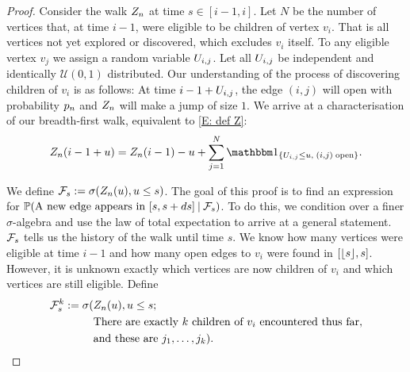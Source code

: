 \begin{proof} \label{P: formula an}
	Consider the walk $Z_n$ at time $s\in[i-1, i]$.
	Let $N$ be the number of vertices that, at time $i-1$, were eligible to be children of vertex $v_i$.
	That is all vertices not yet explored or discovered, which excludes $v_i$ itself.
	To any eligible vertex $v_j$ we assign a random variable $U_{i,j}$.
	Let all $U_{i,j}$ be independent and identically $\mathcal{U}(0,1)$ distributed.
	Our understanding of the process of discovering children of $v_i$ is as follows:
	At time $i-1+U_{i,j}$, the edge $(i,j)$ will open with probability $p_n$ and
	$Z_n$ will make a jump of size $1$.
	We arrive at a characterisation of our breadth-first walk, 
	equivalent to \eqref{E: def Z}:	
	\begin{equation}
	\Zn(i-1+u) = \Zn(i-1) - u + \sum_{j=1}^{N} \Ind{\{\Uij \leq u, \; (i,j) \; \text{open}\}}.
	\end{equation}
	
	We define $\mathcal{F}_s := \sigma(Z_n(u), u\leq s)$.
	The goal of this proof is to find an expression for
	$\mathbb{P}(\text{A new edge appears in $[s, s+ds]$} \: | \: \mathcal{F}_s)$.
	To do this, we condition over a finer $\sigma$-algebra and use the law of total expectation to arrive at a general statement.
	$\mathcal{F}_s$ tells us the history of the walk until time $s$. 
	We know how many vertices were eligible at time $i-1$ and how many open edges to $v_i$ were found in $[\lfloor s\rfloor,s]$.
	However, it is unknown exactly which vertices are now children of $v_i$ and which vertices are still eligible.
	Define 
	\begin{equation}
	\begin{split}
	\mathcal{F}_s^k := \sigma(&Z_n(u), u\leq s; \\
	&\text{There are exactly $k$ children of $v_i$ encountered thus far}, \\
	&\text{and these are $j_1, \dots, j_k$}).
	\end{split}
	\end{equation}
	

\end{proof}
